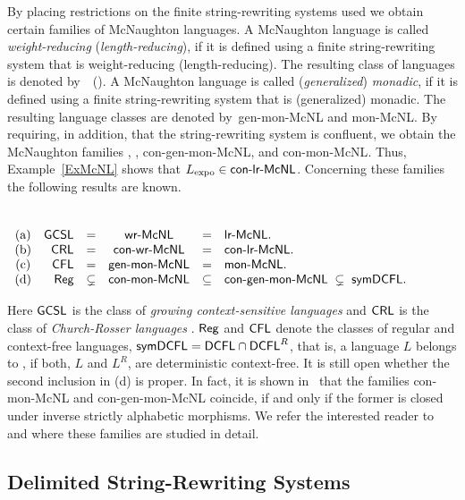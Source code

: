 By placing restrictions on the finite string-rewriting systems used we obtain certain families of McNaughton languages. A McNaughton language is called \emph{weight-reducing} (\emph{length-reducing}), if it is defined using a finite string-rewriting system that is weight-reducing (length-reducing). The resulting class of languages is denoted by~\wrMcNL\ (\lrMcNL). A McNaughton language is called (\emph{generalized}) \emph{monadic}, if it is defined using a finite string-rewriting system that is (generalized) monadic. The resulting language classes are denoted by~{\sf gen-mon-McNL} and {\sf mon-McNL}. By requiring, in addition, that the string-rewriting system is confluent, we obtain the McNaughton families \conwrMcNL, \conlrMcNL, {\sf con-gen-mon-McNL}, and {\sf con-mon-McNL}. Thus, Example~\ref{ExMcNL} shows that $L_{\rm expo}\in \textup{\sf con-lr-McNL}$. Concerning these families the following results are known.

\begin{theorem}{\rm \cite{Beaudry2003,Leupold2011}}\label{ThmMcNL}\\[+0.2cm]
$\begin{array}[t]{crcccl}
{\rm (a)} & \textup{\sf GCSL} & = & \textup{\sf wr-McNL} & = & \textup{\sf lr-McNL}.\\
{\rm (b)} & \textup{\sf CRL}  & = & \textup{\sf con-wr-McNL} & = & \textup{\sf con-lr-McNL}.\\
{\rm (c)} & \textup{\sf CFL}  & = & \textup{\sf gen-mon-McNL} & = & \textup{\sf mon-McNL}.\\
{\rm (d)} & \textup{\sf Reg}  & \subsetneq & \textup{\sf con-mon-McNL} & \subseteq & 
\textup{\sf con-gen-mon-McNL}\; \subsetneq\; \textup{\sf symDCFL}.
\end{array}$
\end{theorem}

Here $\textup{\sf GCSL}$ is the class of \emph{growing context-sensitive languages} \cite{Buntrock19981,Dahlhaus1986} and $\textup{\sf CRL}$ is the class of \emph{Church-Rosser languages} \cite{MNO88}. $\textup{\sf Reg}$ and $\textup{\sf CFL}$ denote the classes of regular and context-free languages, $\textup{\sf symDCFL} = \textup{\sf DCFL}\cap\textup{\sf DCFL}^R$, that is, a language $L$ belongs to \symDCFL, if both, $L$ and $L^R$, are deterministic context-free. It is still open whether the second inclusion in (d) is proper. In fact, it is shown in~\cite{Leupold2011} that the families {\sf con-mon-McNL} and {\sf con-gen-mon-McNL} coincide, if and only if the former is closed under inverse strictly alphabetic morphisms. We refer the interested reader to \cite{Beaudry2003} and \cite{Leupold2011} where these families are studied in detail. 

\subsection{Delimited String-Rewriting Systems}
\label{section:delimited-string-rewriting-systems}

